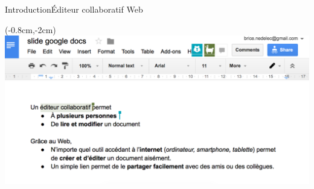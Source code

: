 \begin{frame}{Introduction}{Éditeur collaboratif Web}
    


    \begin{textblock*}{\textwidth}(-0.8cm,-2cm) 
    \includegraphics[width=1.13\textwidth]{img/googledocs3.png}
  \end{textblock*}
\end{frame}


